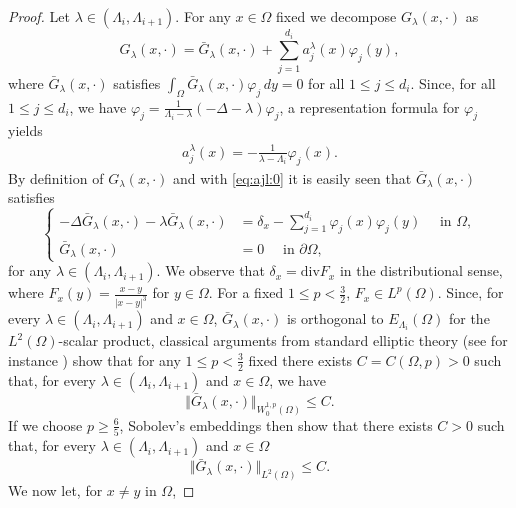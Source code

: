 \documentclass[10pt]{amsart}
\numberwithin{equation}{section}
\newcommand{\vp}{\varphi}
\newcommand{\Om}{\Omega}
\theoremstyle{plain}
\theoremstyle{remark}
\begin{document}
\begin{proof}
Let $\lambda \in (\Lambda_i, \Lambda_{i+1})$. For any $x \in \Om$ fixed we decompose $G_\lambda(x, \cdot)$ as 
$$ G_\lambda(x, \cdot) = \bar{G}_\lambda(x, \cdot) + \sum_{j=1}^{d_i} a_j^{\lambda}(x) \vp_j(y), $$
where $\bar{G}_\lambda(x,\cdot)$ satisfies $\int_{\Om} \bar{G}_\lambda(x,\cdot) \vp_j \, dy = 0$ for all $1 \le j \le d_i$. Since, for all $1 \le j \le d_i$, we have $\vp_j = \frac{1}{\Lambda_i - \lambda} (- \Delta - \lambda)\vp_j$, a representation formula for $\vp_j$ yields
\begin{equation} \label{eq:ajl:0}
 \begin{aligned}
a_j^{\lambda}(x) = -\frac{1}{\lambda - \Lambda_i} \vp_j(x). \end{aligned} 
\end{equation}
By definition of $G_\lambda(x, \cdot)$ and with \eqref{eq:ajl:0} it is easily seen that $\bar{G}_\lambda(x, \cdot)$ satisfies 
\begin{equation} \label{eq:barGlambda}
\left \{\begin{aligned}
- \Delta \bar{G}_\lambda(x, \cdot) - \lambda \bar{G}_\lambda(x, \cdot) &= \delta_x -  \sum_{j=1}^{d_i} \vp_j(x) \vp_j(y)  \quad \text{ in } \Om, \\
  \bar{G}_\lambda(x, \cdot) & = 0 \quad \text{ in } \partial \Om,
\end{aligned} \right.
\end{equation}
for any $\lambda \in (\Lambda_i, \Lambda_{i+1})$. We observe that $\delta_x = \text{div} F_x$ in the distributional sense, where $F_x(y) = \frac{x-y}{|x-y|^3}$ for $y \in \Om$. For a fixed $1 \le p < \frac32$, $F_x \in L^p(\Om)$. Since, for every $\lambda \in (\Lambda_i, \Lambda_{i+1})$ and $x\in \Om$, $\bar{G}_\lambda(x, \cdot)$ is orthogonal to $E_{\Lambda_i}(\Om)$ for the $L^2(\Om)$-scalar product, classical arguments from standard elliptic theory (see for instance \cite[Theorem 7.1, Theorem 7.4]{GiaquintaMartinazzi}) show that for any $1 \le p < \frac32$ fixed there exists $C = C(\Om,p) >0$ such that, for every $\lambda \in (\Lambda_i, \Lambda_{i+1})$ and $x\in \Om$, we have 
$$ \Vert \bar{G}_\lambda(x,\cdot) \Vert_{W^{1,p}_0(\Om)} \le C . $$
If we choose $p \ge \frac65$, Sobolev's embeddings then show that there exists $C >0$ such that, for every $\lambda \in (\Lambda_i, \Lambda_{i+1})$ and $x\in \Om$
\begin{equation} \label{estL2uniforme}
\Vert \bar{G}_\lambda(x,\cdot) \Vert_{L^2(\Om)} \le C. 
\end{equation}
We now let, for $x \neq y$ in $\Om$, 

\end{proof}
\end{document}
